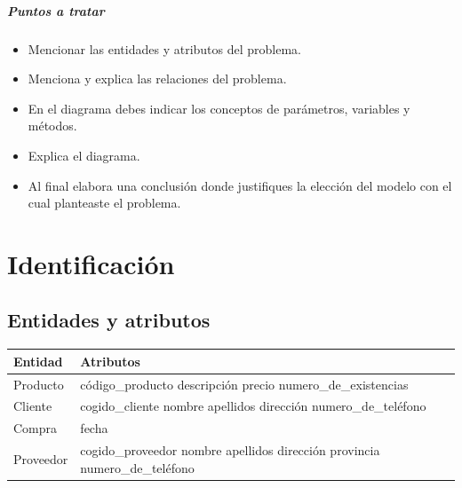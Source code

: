 \documentclass[spanish,12pt,letterpapper]{article}
\begin{document}
	\subparagraph{Puntos a tratar}
	\begin{itemize}
	\item Mencionar las entidades y atributos del problema.
	\item Menciona y explica las relaciones del problema.
	\item En el diagrama debes indicar los conceptos de parámetros, variables y métodos.
	\item Explica el diagrama.
	\item Al final elabora una conclusión donde justifiques la elección del modelo con el cual planteaste el problema.
	\end{itemize}
	
	
	\section{Identificación}
	
	\subsection{Entidades y atributos}
	
		\begin{center}
	\begin{tabular}{| p{4cm} | p{4cm} |}
	\hline
	
	\textbf{Entidad} & \textbf{Atributos}\\
	\hline
	Producto & código\_producto \linebreak descripción \linebreak precio \linebreak numero\_de\_existencias\\
	\hline
	Cliente & cogido\_cliente \linebreak nombre \linebreak apellidos \linebreak dirección \linebreak numero\_de\_teléfono\\
	\hline
	Compra & fecha \\
	\hline
	Proveedor & cogido\_proveedor \linebreak nombre \linebreak apellidos \linebreak dirección \linebreak provincia \linebreak numero\_de\_teléfono\\
	\hline	
	\end{tabular}
	\end{center}
	
\end{document}
